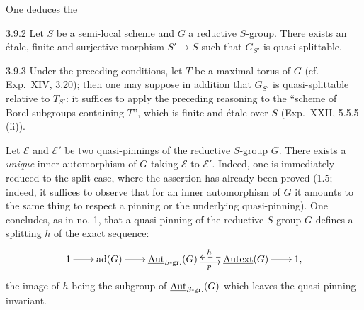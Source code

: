 One deduces the
\begin{corollary}{3.9.2}\label{XXIV.3.9.2}
Let $S$ be a semi-local scheme and $G$ a reductive $S$-group. There exists an étale, finite and surjective morphism $S'\to S$ such that $G_{S'}$ is quasi-splittable.
\end{corollary}
\begin{remark}{3.9.3}\label{XXIV.3.9.3}
Under the preceding conditions, let $T$ be a maximal torus of $G$ (cf. Exp.~XIV, 3.20); then one may suppose in addition that $G_{S'}$ is quasi-splittable relative to $T_{S'}$: it suffices to apply the preceding reasoning to the ``scheme of Borel subgroups containing $T$'', which is finite and étale over $S$ (Exp.~XXII, 5.5.5 (ii)).
\end{remark}
\label{XXIV.3.10}
Let $\mathscr E$ and $\mathscr E'$ be two quasi-pinnings of the reductive $S$-group $G$. There exists a \emph{unique} inner automorphism of $G$ taking $\mathscr E$ to $\mathscr E'$. Indeed, one is immediately reduced to the split case, where the assertion has already been proved (1.5; indeed, it suffices to observe that for an inner automorphism of $G$ it amounts to the same thing to respect a pinning or the underlying quasi-pinning). One concludes, as in no. 1, that a quasi-pinning of the reductive $S$-group $G$ defines a splitting $h$ of the exact sequence:
\[
\xymatrix@C=2em{1\ar[r]&\ad(G)\ar[r]&\underline{\Aut}_{S\text{-gr.}}(G)\ar@<-.6ex>[r]_p&\underline{\operatorname{Autext}}(G)\ar@<-.6ex>@{-->}[l]_h\ar[r]&1,}
\]
the image of $h$ being the subgroup of $\underline{\operatorname{Aut}}_{S\text{-gr.}}(G)$ which leaves the quasi-pinning invariant.


